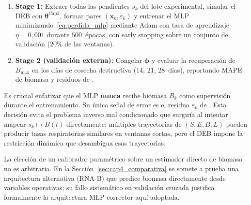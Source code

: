 \begin{enumerate}
\item \textbf{Stage 1:} Extraer todas las pendientes $s_k$ del lote experimental, simular el DEB con $\boldsymbol{\theta}^{\mathrm{Cap3}}$, formar pares $(\mathbf{x}_k, \varepsilon_k)$ y entrenar el MLP minimizando~\eqref{eq:perdida_mlp} mediante Adam con tasa de aprendizaje $\eta = 0{,}001$ durante $500$~épocas, con early stopping sobre un conjunto de validación ($20\%$ de las ventanas).
\item \textbf{Stage 2 (validación externa):} Congelar $\boldsymbol{\phi}$ y evaluar la recuperación de $B_{\max}$ en los días de cosecha destructiva (14, 21, 28~días), reportando MAPE de biomasa y residuos de .
\end{enumerate}

Es crucial enfatizar que el MLP \textbf{nunca} recibe biomasa $B_k$ como supervisión durante el entrenamiento. Su única señal de error es el residuo $\varepsilon_k$ de . Esta decisión evita el problema inverso mal condicionado que surgiría al intentar mapear $s_k \mapsto B(t)$ directamente: múltiples trayectorias de $(S, E, B, L)$ pueden producir tasas respiratorias similares en ventanas cortas, pero el DEB impone la restricción dinámica que desambigua esas trayectorias.

La elección de un calibrador paramétrico sobre un estimador directo de biomasa 
no es arbitraria. En la Sección~\ref{sec:cap4_comparativa} se somete a prueba 
una arquitectura alternativa (RNA-B) que predice biomasa directamente desde 
variables operativas; su fallo sistemático en validación cruzada justifica 
formalmente la arquitectura MLP corrector aquí adoptada.